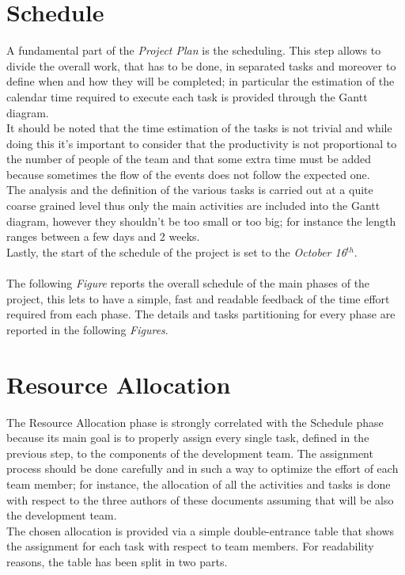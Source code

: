 \documentclass[11pt,a4paper]{report}
\begin{document}
\chapter{Schedule}
A fundamental part of the \textit{Project Plan} is the scheduling. This step allows to divide the overall work, that has to be done, in separated tasks and moreover to define when and how they will be completed; in particular the estimation of the calendar time required to execute each task is provided through the Gantt diagram.\\
It should be noted that the time estimation of the tasks is not trivial and while doing this it's important to consider that the productivity is not proportional to the number of people of the team and that some extra time must be added because sometimes the flow of the events does not follow the expected one.\\
The analysis and the definition of the various tasks is carried out at a quite coarse grained level thus only the main activities are included into the Gantt diagram, however they shouldn't be too small or too big; for instance the length ranges between a few days and 2 weeks.\\
Lastly, the start of the schedule of the project is set to the \textit{October 16$^{th}$}.\\
\\
The following \textit{Figure} reports the overall schedule of the main phases of the project, this lets to have a simple, fast and readable feedback of the time effort required from each phase.
\noindent The details and tasks partitioning for every phase are reported in the following \textit{Figures}.
\chapter{Resource Allocation}
The Resource Allocation phase is strongly correlated with the Schedule phase because its main goal is to properly assign every single task, defined in the previous step, to the components of the development team.
The assignment process should be done carefully and in such a way to optimize the effort of each team member; for instance, the allocation of all the activities and tasks is done with respect to the three authors of these documents assuming that will be also the development team.\\
The chosen allocation is provided via a simple double-entrance table that shows the assignment for each task with respect to team members. For readability reasons, the table has been split in two parts.
\end{document}

